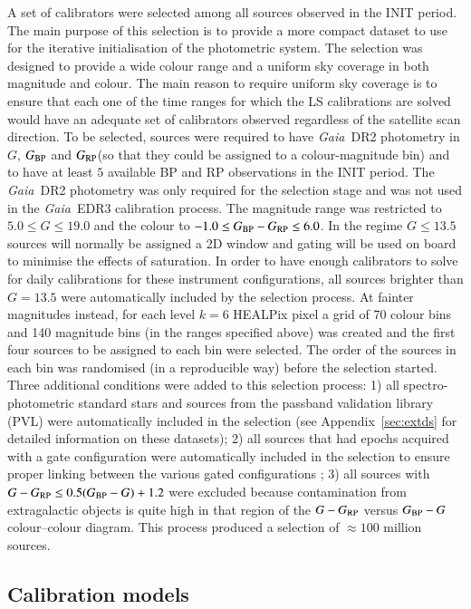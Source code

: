 \documentclass{aa}
\newcommand{\gaia}{\textit{Gaia}\xspace}
\newcommand{\gbp}{\ensuremath{G_{\rm BP}}\xspace}
\newcommand{\grp}{\ensuremath{G_{\rm RP}}\xspace}
\newcommand{\bprp}{\ensuremath{G_{\rm BP}-G_{\rm RP}}\xspace}
\newcommand{\drt}{\gaia~DR2\xspace}
\newcommand{\edr}{\gaia~EDR3\xspace}
\newcommand{\xp}{BP and RP\xspace}
\newcommand{\appref}[1]{Appendix~\ref{sec:#1}}
\begin{document}
A set of calibrators were selected among all sources observed in the INIT period. The main purpose of this selection is to provide a more compact dataset to use for the iterative initialisation of the photometric system. The selection was designed to provide a wide colour range and a uniform sky coverage in both magnitude and colour. The main reason to require uniform sky coverage is to ensure that each one of the time ranges for which the LS calibrations are solved would have an adequate set of calibrators observed regardless of the satellite scan direction.  To be selected, sources were required to have \drt photometry in $G$, \gbp and \grp (so that they could be assigned to a colour-magnitude bin) and to have at least $5$ available \xp observations in the INIT period. The \drt photometry was only required for the selection stage and was not used in the \edr calibration process. The magnitude range was restricted to $5.0\leq G\leq19.0$ and the colour to $-1.0\leq\bprp\leq 6.0$. In the regime $G\leq13.5$ sources will normally be assigned a 2D window and gating will be used on board to minimise the effects of saturation. In order to have enough calibrators to solve for daily calibrations for these instrument configurations, all sources brighter than $G=13.5$ were automatically included by the selection process. At fainter magnitudes instead, for each level $k=6$ HEALPix \citep{HPIX} pixel a grid of 70 colour bins and 140 magnitude bins (in the ranges specified above) was created and the first four sources to be assigned to each bin were selected. The order of the sources in each bin was randomised (in a reproducible way) before the selection started. Three additional conditions were added to this selection process: 1) all spectro-photometric standard stars  \citep[SPSS,][]{SPSS} and sources from the passband validation library (PVL) were automatically included in the selection (see \appref{extds} for detailed information on these datasets); 2) all sources that had epochs acquired with a gate configuration were automatically included in the selection to ensure proper linking between the various gated configurations \citep[see][for more details]{Phot_DR2}; 3) all sources with $G-\grp\leq0.5(\gbp-G) + 1.2$ were excluded because contamination from extragalactic objects is quite high in that region of the $G-\grp$ versus $\gbp-G$ colour--colour diagram.
This process produced a selection of $\approx100$ million sources.

\subsection{Calibration models}\label{sec:calmodel}
\end{document}
